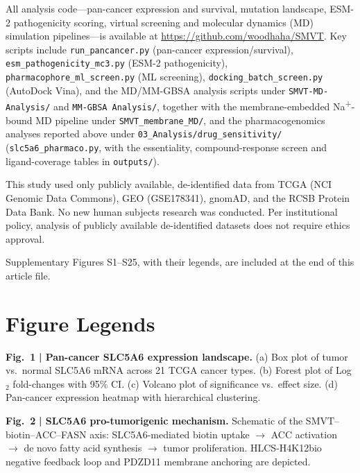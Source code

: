 \documentclass[pdflatex,sn-nature]{sn-jnl}
\begin{document}
\begin{backmatter}
All analysis code---pan-cancer expression and survival, mutation landscape, ESM-2 pathogenicity scoring, virtual screening and molecular dynamics (MD) simulation pipelines---is available at \url{https://github.com/woodhaha/SMVT}. Key scripts include \texttt{run\_pancancer.py} (pan-cancer expression/survival), \texttt{esm\_pathogenicity\_mc3.py} (ESM-2 pathogenicity), \texttt{pharmacophore\_ml\_screen.py} (ML screening), \texttt{docking\_batch\_screen.py} (AutoDock Vina), and the MD/MM-GBSA analysis scripts under \texttt{SMVT-MD-Analysis/} and \texttt{MM-GBSA Analysis/}, together with the membrane-embedded Na\textsuperscript{+}-bound MD pipeline under \texttt{SMVT\_membrane\_MD/}, and the pharmacogenomics analyses reported above under \texttt{03\_Analysis/drug\_sensitivity/} (\texttt{slc5a6\_pharmaco.py}, with the essentiality, compound-response screen and ligand-coverage tables in \texttt{outputs/}).

This study used only publicly available, de-identified data from TCGA (NCI Genomic Data Commons), GEO (GSE178341), gnomAD, and the RCSB Protein Data Bank. No new human subjects research was conducted. Per institutional policy, analysis of publicly available de-identified datasets does not require ethics approval.

Supplementary Figures S1--S25, with their legends, are included at the end of this article file.

\end{backmatter}


\clearpage
\section*{Figure Legends}

\noindent\textbf{Fig.~1} \textbf{| Pan-cancer SLC5A6 expression landscape.} (a) Box plot of tumor vs.\ normal SLC5A6 mRNA across 21 TCGA cancer types. (b) Forest plot of Log$_2$ fold-changes with 95\% CI. (c) Volcano plot of significance vs.\ effect size. (d) Pan-cancer expression heatmap with hierarchical clustering.

\noindent\textbf{Fig.~2} \textbf{| SLC5A6 pro-tumorigenic mechanism.} Schematic of the SMVT--biotin--ACC--FASN axis: SLC5A6-mediated biotin uptake $\rightarrow$ ACC activation $\rightarrow$ de novo fatty acid synthesis $\rightarrow$ tumor proliferation. HLCS-H4K12bio negative feedback loop and PDZD11 membrane anchoring are depicted.
\end{document}
